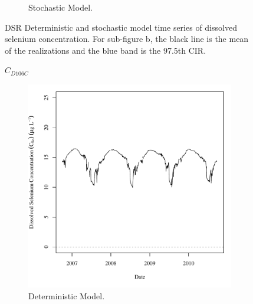 \begin{linenumbers}
\begin{landscape}
\begin{figure}
\begin{subfigure}{0.7\textwidth}
			\caption{Stochastic Model.}
		\end{subfigure}
		\caption[DSR Deterministic and stochastic model time series of dissolved selenium concentration.]{DSR Deterministic and stochastic model time series of dissolved selenium concentration.  For sub-figure b, the black line is the mean of the realizations and the blue band is the 97.5th CIR.}
		\label{fig:concCSeTS_DS}
	\end{figure}
\end{landscape}

\subfiguremid
\begin{landscape}
	\begin{figure}
		$ C_{D106C} $
		\begin{subfigure}{0.7\textwidth}
			\centering
			\includegraphics[width=\tableCustomSize]{"Figures/Results_DSR/Deterministic/c TS D106C"}
			\caption{Deterministic Model.}
		\end{subfigure}%
		\begin{subfigure}{0.7\textwidth}
			\centering

\end{subfigure}
\end{figure}
\end{landscape}
\end{linenumbers}
